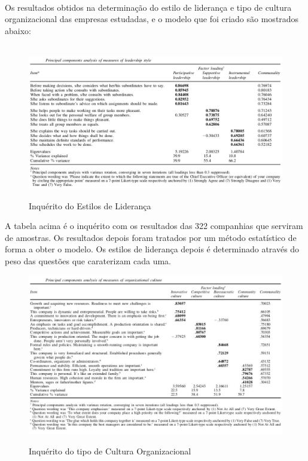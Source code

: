 \vspace{1cm}\\
Os resultados obtidos na determinação do estilo de liderança e tipo de cultura organizacional das empresas estudadas, e o modelo que foi criado são mostrados abaixo:\\
\\
\begin{figure}[H]
\centering
\includegraphics[scale=.5]{"./image/OB/Leadership.jpg"}\\
\caption{Inquérito do Estilos de Liderança \cite{article_1}}
\end{figure}\par
\newpage
A tabela acima é o inquérito com os resultados das 322 companhias que serviram de amostras. Os resultados depois foram tratados por um método estatístico de forma a obter o modelo. Os estilos de liderança depois é determinado através do peso das questões que caraterizam cada uma.
\vspace{1cm}
\begin{figure}[H]
\centering
\includegraphics[scale=.6]{"./image/OB/Culture.jpg"}\\
\caption{Inquérito do tipo de Cultura Organizacional \cite{article_1}}
\end{figure}\par

